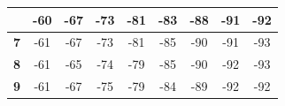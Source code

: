 \begin{table}[h]
\begin{adjustbox}{width=1\textwidth}
\begin{tabular}{|c|c|c|c|c|c|c|c|c|}
\\ \hline
\cellcolor[HTML]{C0C0C0}{\color[HTML]{000000} \textbf{6}}      & -60                                                                                     & -67                                                                                      & -73                                                                                      & -81                                                                                      & -83                                                               & -88                                                               & -91                                                               & -92
\\ \hline
\rowcolor[HTML]{EFEFEF} 
\cellcolor[HTML]{C0C0C0}\textbf{7}                             & -61                                                                                     & -67                                                                                      & -73                                                                                      & -81                                                                                      & -85                                                               & -90                                                               & -91                                                               & -93
\\ \hline
\cellcolor[HTML]{C0C0C0}\textbf{8}                             & -61                                                                                     & -65                                                                                     & -74                                                                                      & -79                                                                                      & -85                                                               & -90                                                               & -92                                                               & -93
\\ \hline
\rowcolor[HTML]{EFEFEF} 
\cellcolor[HTML]{C0C0C0}\textbf{9}                             & -61                                                                                     & -67                                                                                      & -75                                                                                      & -79                                                                                      & -84                                                               & -89                                                               & -92                                                               & -92

\end{tabular}
\end{adjustbox}
\end{table}
